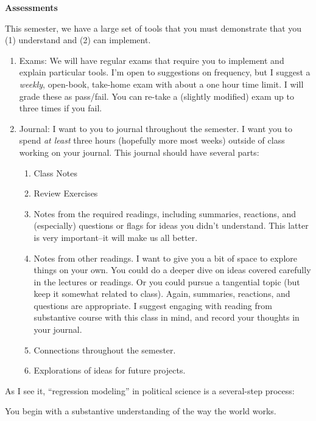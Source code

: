\documentclass[
]{book}
\providecommand{\tightlist}{%
  \setlength{\itemsep}{0pt}\setlength{\parskip}{0pt}}
\begin{document}
\textbf{Assessments}

This semester, we have a large set of tools that you must demonstrate
that you (1) understand and (2) can implement.

\begin{enumerate}
\def\labelenumi{\arabic{enumi}.}
\tightlist
\item
  Exams: We will have regular exams that require you to implement and
  explain particular tools. I'm open to suggestions on frequency, but I
  suggest a \emph{weekly}, open-book, take-home exam with about a one
  hour time limit. I will grade these as pass/fail. You can re-take a
  (slightly modified) exam up to three times if you fail.
\item
  Journal: I want to you to journal throughout the semester. I want you
  to spend \emph{at least} three hours (hopefully more most weeks)
  outside of class working on your journal. This journal should have
  several parts:

  \begin{enumerate}
  \def\labelenumii{\alph{enumii}.}
  \tightlist
  \item
    Class Notes
  \item
    Review Exercises
  \item
    Notes from the required readings, including summaries, reactions,
    and (especially) questions or flags for ideas you didn't understand.
    This latter is very important--it will make us all better.
  \item
    Notes from other readings. I want to give you a bit of space to
    explore things on your own. You could do a deeper dive on ideas
    covered carefully in the lectures or readings. Or you could pursue a
    tangential topic (but keep it somewhat related to class). Again,
    summaries, reactions, and questions are appropriate. I suggest
    engaging with reading from substantive course with this class in
    mind, and record your thoughts in your journal.
  \item
    Connections throughout the semester.
  \item
    Explorations of ideas for future projects.
  \end{enumerate}
\end{enumerate}

As I see it, ``regression modeling'' in political science is a
several-step process:

You begin with a substantive understanding of the way the world works.
\end{document}
